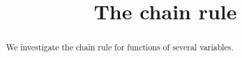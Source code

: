 \documentclass{ximera}
\title[Dig-In:]{The chain rule}
\begin{document}
\begin{abstract}
  We investigate the chain rule for functions of several variables.
\end{abstract}
\maketitle
\end{document}
